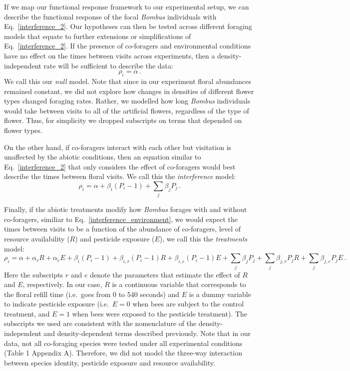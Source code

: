 \begin{refsection}
If we map our functional response framework to our experimental setup, we can describe the functional response of the focal \textit{Bombus} individuals with Eq.~\ref{interference_2}. Our hypotheses can then be tested across different foraging models that equate to further extensions or simplifications of Eq.~\ref{interference_2}. If the presence of co-foragers and environmental conditions have no effect on the times between visits across experiments, then a density-independent rate will be sufficient to describe the data:
\begin{equation}
    \rho_{i}= \alpha \,.
    \label{null}
\end{equation}
We call this our \textit{null} model. Note that since in our experiment floral abundances remained constant, we did not explore how changes in densities of different flower types changed foraging rates. Rather, we modelled how long \textit{Bombus} individuals would take between visits to all of the artificial flowers, regardless of the type of flower. Thus, for simplicity we dropped subscripts on terms that depended on flower types.

On the other hand, if co-foragers interact with each other but visitation is unaffected by the abiotic conditions, then an equation similar to Eq.~\ref{interference_2} that only considers the effect of co-foragers would best describe the times between floral visits. We call this the \textit{interference} model:
\begin{equation}
\label{interference_3}
		\rho_{i} =\alpha + \beta_{i} (P_{i}-1) + \sum_{j}\beta_{j}P_{j} \,.
\end{equation}

Finally, if the abiotic treatments modify how \textit{Bombus} forages with and without co-foragers, similiar to Eq.~\ref{interference_environment}, we would expect the times between visits to be a function of the abundance of co-foragers, level of resource availability ($R$) and pesticide exposure ($E$), we call this the \textit{treatments} model:
\begin{equation}
\label{treatments}
\rho_{i} =\alpha + \alpha_{r} R+   \alpha_{e}E +  \beta_{i} (P_{i}-1) +  \beta_{i,r} (P_{i}-1) R +  \beta_{i,e} (P_{i}-1) E        + \sum_{j}\beta_{j}P_{j}  +  \sum_{j}\beta_{j,r}P_{j}R +  \sum_{j}\beta_{j,e}P_{j}  E \,.
\end{equation}
Here the subscripts  $r$ and $e$ denote the parameters that estimate the effect of $R$ and $E$, respectively. In our case, $R$ is a continuous variable that corresponds to the floral refill time (i.e.\ goes from 0 to 540 seconds) and $E$ is a dummy variable to indicate pesticide exposure (i.e.\ $E = 0$ when bees are subject to the control treatment, and $E=1$ when bees were exposed to the pesticide treatment). The subscripts we used are consistent with the nomenclature of the density-independent and density-dependent terms described previously. Note that in our data, not all co-foraging species were tested under all experimental conditions (Table 1 Appendix A). Therefore, we did not model the three-way interaction between species identity, pesticide exposure and resource availability.



\end{refsection}

